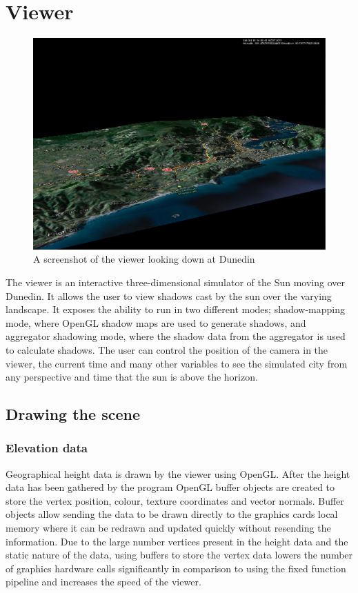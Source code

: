 \documentclass[12pt]{report}
\begin{document}
\chapter{Viewer}

\begin{figure}[h]
\centering
\includegraphics[scale=0.4]{viewer.png}
\caption{A screenshot of the viewer looking down at Dunedin}
\label{image:viewer}
\end{figure}

The viewer is an interactive three-dimensional simulator of the Sun moving over Dunedin. It allows the user to view shadows cast by the sun over the varying landscape. It exposes the ability to run in two different modes; shadow-mapping mode, where OpenGL shadow maps are used to generate shadows, and aggregator shadowing mode, where the shadow data from the aggregator is used to calculate shadows. The user can control the position of the camera in the viewer, the current time and many other variables to see the simulated city from any perspective and time that the sun is above the horizon.\\

\section{Drawing the scene}
\subsection{Elevation data}
Geographical height data is drawn by the viewer using OpenGL. After the height data has been gathered by the program OpenGL buffer objects are created to store the vertex position, colour, texture coordinates and vector normals. Buffer objects allow sending the data to be drawn directly to the graphics cards local memory where it can be redrawn and updated quickly without resending the information. Due to the large number vertices present in the height data and the static nature of the data, using buffers to store the vertex data lowers the number of graphics hardware calls significantly in comparison to using the fixed function pipeline and increases the speed of the viewer.\\
\end{document}
